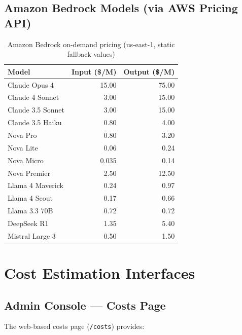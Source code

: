 \documentclass[11pt,a4paper]{article}
\begin{document}
\subsection{Amazon Bedrock Models (via AWS Pricing API)}

\begin{table}[H]
\centering
\begin{tabular}{lrr}
\toprule
\textbf{Model} & \textbf{Input (\$/M)} & \textbf{Output (\$/M)} \\
\midrule
Claude Opus 4 & 15.00 & 75.00 \\
Claude 4 Sonnet & 3.00 & 15.00 \\
Claude 3.5 Sonnet & 3.00 & 15.00 \\
Claude 3.5 Haiku & 0.80 & 4.00 \\
Nova Pro & 0.80 & 3.20 \\
Nova Lite & 0.06 & 0.24 \\
Nova Micro & 0.035 & 0.14 \\
Nova Premier & 2.50 & 12.50 \\
Llama 4 Maverick & 0.24 & 0.97 \\
Llama 4 Scout & 0.17 & 0.66 \\
Llama 3.3 70B & 0.72 & 0.72 \\
DeepSeek R1 & 1.35 & 5.40 \\
Mistral Large 3 & 0.50 & 1.50 \\
\bottomrule
\end{tabular}
\caption{Amazon Bedrock on-demand pricing (us-east-1, static fallback values)}
\end{table}

\section{Cost Estimation Interfaces}

\subsection{Admin Console --- Costs Page}

The web-based costs page (\texttt{/costs}) provides:
\end{document}

